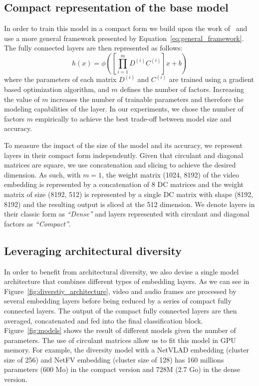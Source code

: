 \documentclass[runningheads]{llncs}
\begin{document}
\subsection{Compact representation of the base model}
\label{subsection:compact}

In order to train this model in a compact form we build upon the work of~\cite{7410684} and use a more general framework presented by  Equation~\ref{eq:general_framework}. The fully connected layers are then represented as follows:
$$h(x) = \phi\left(\left[\prod_{i=1}^{m} D^{(i)} C^{(i)}\right]x + b\right)$$
\noindent
where the parameters of each matrix $D^{(i)}$ and $C^{(i)}$ are trained using a gradient based optimization algorithm, and $m$ defines the number of factors. Increasing the value of $m$ increases the number of trainable parameters and therefore the modeling capabilities of the layer. In our experiments, we chose the number of factors $m$ empirically to achieve the best trade-off between model size and accuracy.

To measure the impact of the size of the model and its accuracy, we represent layers in their compact form independently. 
Given that circulant and diagonal matrices are square, we use concatenation and slicing to achieve the desired dimension. As such, with $m=1$, the weight matrix (1024, 8192) of the video embedding is represented by a concatenation of 8 DC matrices and the weight matrix of size (8192, 512) is represented by a single DC matrix with shape (8192, 8192) and the resulting output is sliced at the 512 dimension. We denote layers in their classic form as \textit{``Dense''} and layers represented with circulant and diagonal factors as \textit{``Compact''}.



\subsection{Leveraging architectural diversity}
\label{subsection:ensemble}

In order to benefit from architectural diversity, we also devise a single model architecture that combines different types of embedding layers. As we can see in Figure~\ref{fig:diverstiy_architecture}, video and audio frames are processed by several embedding layers before being reduced by a series of compact fully connected layers. The output of the compact fully connected layers are then averaged, concatenated and fed into the final classification block. Figure~\ref{fig:models} shows the result of different models given the number of parameters. The use of circulant matrices allow us to fit this model in GPU memory. For example, the diversity model with a NetVLAD embedding (cluster size of 256) and NetFV embedding (cluster size of 128) has 160 millions parameters (600 Mo) in the compact version and 728M (2.7 Go) in the dense version. 
\end{document}
